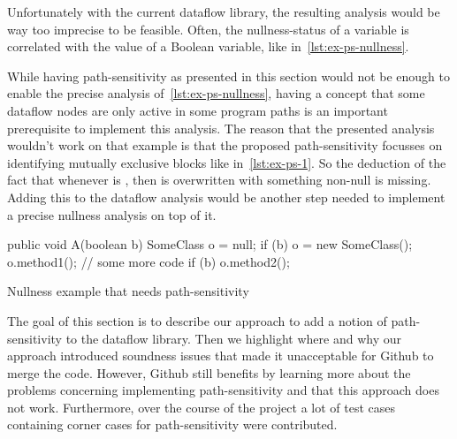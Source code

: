 Unfortunately with the current dataflow library, the resulting analysis would 
be way too imprecise to be feasible.
Often, the nullness-status of a variable is correlated with the value of a Boolean 
variable, like in~\autoref{lst:ex-ps-nullness}.

While having path-sensitivity as presented in this section would not be enough 
to enable the precise analysis of~\autoref{lst:ex-ps-nullness},
having a concept that some dataflow nodes are only active in some program paths 
is an important prerequisite to implement this analysis.
The reason that the presented analysis wouldn't work on that example is that
the proposed path-sensitivity focusses on identifying mutually exclusive 
blocks like in~\autoref{lst:ex-ps-1}.
So the deduction of the fact that whenever  is ,
then  is overwritten with something non-null is missing.
Adding this to the dataflow analysis would be another step needed to 
implement a precise nullness analysis on top of it.

\begin{listing}[h]
    \begin{javacode}
public void A(boolean b) {
    SomeClass o = null;
    if (b) {
        o = new SomeClass();
        o.method1();
    }
    // some more code
    if (b) {
        o.method2();
    }
}
    \end{javacode}
    \caption{Nullness example that needs path-sensitivity}
    \label{lst:ex-ps-nullness}
\end{listing}


The goal of this section is to describe our approach to add a notion of
path-sensitivity to the dataflow library.
Then we highlight where and why our approach introduced soundness issues
that made it unacceptable for Github to merge the code.
However, Github still benefits by learning more about the problems
concerning implementing path-sensitivity and that this approach does not work.
Furthermore, over the course of the project a lot of test cases containing
corner cases for path-sensitivity were contributed.



